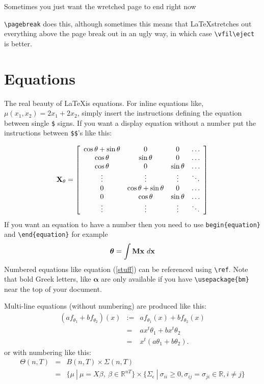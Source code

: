 \documentclass[11pt,a4paper]{article}
\begin{document}
Sometimes you just want the wretched page to end right now

\pagebreak

\verb+\pagebreak+ does this, although sometimes this means that \LaTeX stretches out everything above the page break out in an ugly way, in which case \verb+\vfil\eject+ is better.

\section{Equations}

The real beauty of \LaTeX is equations. For inline equations like, $\mu(x_1,x_2) = 2 x_1 + 2 x_2$, simply insert the instructions defining the equation between single \verb+$+ signs. If you want a display equation without a number put the instructions between \verb+$$+'s like this:

$$ {\bf X}_\theta = \left[ \begin{array}{cccc}
\cos \theta + \sin\theta & 0 &0 & \ldots \\
\cos\theta & \sin\theta & 0 &\ldots \\
\cos\theta & 0 & \sin\theta& \ldots \\
\vdots &\vdots &\vdots& \ddots \\
0&   \cos \theta + \sin\theta & 0 & \ldots \\
0 &\cos\theta & \sin\theta & \ldots \\
\vdots &\vdots &\vdots& \ddots \\
\end{array} \right]
$$
If you want an equation to have a number then you need to use \verb+begin{equation}+ and \verb+\end{equation}+ for example
\begin{equation}
{\bm \theta} = \int {\bf Mx} ~ d{\bf x} \label{stuff}
\end{equation}
Numbered equations like equation (\ref{stuff}) can be referenced using \verb+\ref+. Note that bold Greek letters, like $\bm \alpha$ are only available if you have \verb+\usepackage{bm}+ near the top of your document.

Multi-line equations (without numbering) are produced like this:
\begin{eqnarray*}
  \left(a f_{\theta_1} + b f_{\theta_2}\right) (x)
        &:=& a f_{\theta_1}(x) + b f_{\theta_2}(x) \\
        &=& a x^t \theta_1 + b x^t \theta_2 \\
        &=& x^t (a \theta_1 + b \theta_2).
\end{eqnarray*}
or with numbering like this:
\begin{eqnarray}
\label{eq:sur_par_space}
\Theta(n,T) &=& B(n,T) \times \Sigma(n,T) \\
&=& \{\mu~|~\mu=X\beta,~\beta\in\mathbb{R}^{nT}\} \times
\{\Sigma_\epsilon ~|~ \sigma_{ii} \geq 0, \sigma_{ij}=\sigma_{ji}
\in \mathbb{R}, i \not = j \}\nonumber
\end{eqnarray}
\end{document}

